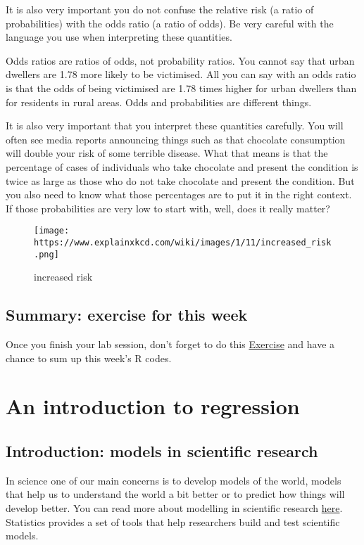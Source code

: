 \documentclass[
]{book}
\begin{document}
It is also very important you do not confuse the relative risk (a ratio of probabilities) with the odds ratio (a ratio of odds). Be very careful with the language you use when interpreting these quantities.

Odds ratios are ratios of odds, not probability ratios. You cannot say that urban dwellers are 1.78 more likely to be victimised. All you can say with an odds ratio is that the odds of being victimised are 1.78 times higher for urban dwellers than for residents in rural areas. Odds and probabilities are different things.

It is also very important that you interpret these quantities carefully. You will often see media reports announcing things such as that chocolate consumption will double your risk of some terrible disease. What that means is that the percentage of cases of individuals who take chocolate and present the condition is twice as large as those who do not take chocolate and present the condition. But you also need to know what those percentages are to put it in the right context. If those probabilities are very low to start with, well, does it really matter?

\begin{figure}
\centering
\texttt{[image: https://www.explainxkcd.com/wiki/images/1/11/increased\_risk.png]}
\caption{increased risk}
\end{figure}

\section{Summary: exercise for this week}\label{summary-exercise-for-this-week-6}

Once you finish your lab session, don't forget to do this \href{https://eonk.shinyapps.io/MCD_ex}{Exercise} and have a chance to sum up this week's R codes.

\chapter{An introduction to regression}\label{an-introduction-to-regression}

\section{Introduction: models in scientific research}\label{introduction-models-in-scientific-research}

In science one of our main concerns is to develop models of the world, models that help us to understand the world a bit better or to predict how things will develop better. You can read more about modelling in scientific research \href{https://www.visionlearning.com/en/library/Process-of-Science/49/Modeling-in-Scientific-Research/153}{here}. Statistics provides a set of tools that help researchers build and test scientific models.
\end{document}
